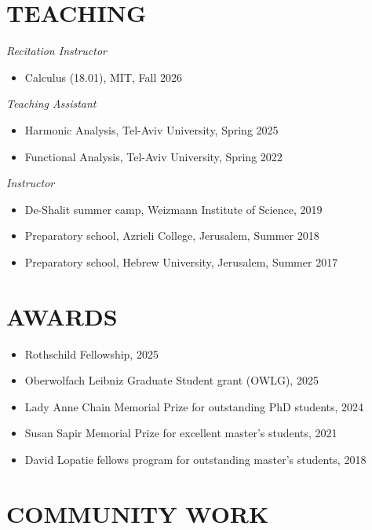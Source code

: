 \documentclass[margin, 10pt]{res}
\begin{document}
\begin{resume}
\section{TEACHING}

{\sl Recitation Instructor} \\

\begin{itemize}
    \item Calculus (18.01), MIT, Fall 2026
\end{itemize}

{\sl Teaching Assistant} \\

\begin{itemize}
    \item Harmonic Analysis, Tel-Aviv University, Spring 2025
    \item Functional Analysis, Tel-Aviv University, Spring 2022
\end{itemize}

{\sl Instructor}\\

\begin{itemize}
    \item De-Shalit summer camp, Weizmann Institute of Science, 2019
    \item Preparatory school, Azrieli College, Jerusalem, Summer 2018
    \item Preparatory school, Hebrew University, Jerusalem, Summer 2017
\end{itemize}


\section{AWARDS}
    \begin{itemize}
        \item Rothschild Fellowship, 2025
        \item Oberwolfach Leibniz Graduate Student grant (OWLG), 2025
        \item Lady Anne Chain Memorial Prize for outstanding PhD students, 2024
        \item Susan Sapir Memorial Prize for excellent master's students, 2021
        \item David Lopatie fellows program for outstanding master's students,  2018
    \end{itemize}

\section{COMMUNITY WORK}


\end{resume}
\end{document}

